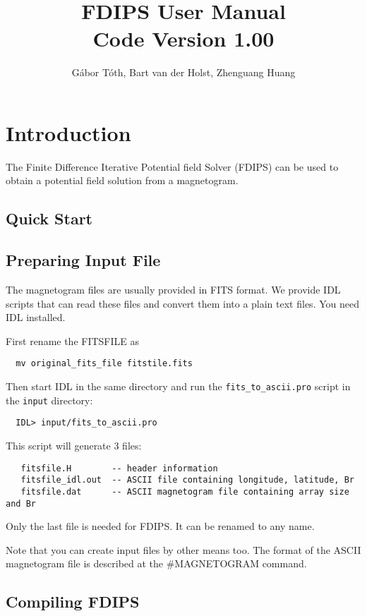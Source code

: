 \documentclass[12pt]{article}
\title{FDIPS User Manual \\ \large Code Version 1.00}
\author{G\'abor T\'oth, Bart van der Holst, Zhenguang Huang}
\begin{document}
\maketitle

\section{Introduction}

The Finite Difference Iterative Potential field Solver (FDIPS) can be
used to obtain a potential field solution from a magnetogram.

\subsection{Quick Start}



\subsection{Preparing Input File}

The magnetogram files are usually provided in FITS format. We provide
IDL scripts that can read these files and convert them into a plain
text files. You need IDL installed. 

First rename the FITSFILE as
\begin{verbatim}
  mv original_fits_file fitstile.fits
\end{verbatim}
Then start IDL in the same directory and run the {\tt fits\_to\_ascii.pro}
script in the {\tt input} directory:
\begin{verbatim}
  IDL> input/fits_to_ascii.pro
\end{verbatim}
This script will generate 3 files:
\begin{verbatim}
   fitsfile.H        -- header information
   fitsfile_idl.out  -- ASCII file containing longitude, latitude, Br
   fitsfile.dat      -- ASCII magnetogram file containing array size and Br
\end{verbatim}
Only the last file is needed for FDIPS. It can be renamed to any name.

Note that you can create input files by other means too. The format of the
ASCII magnetogram file is described at the \#MAGNETOGRAM command.

\subsection{Compiling FDIPS}
\end{document}
